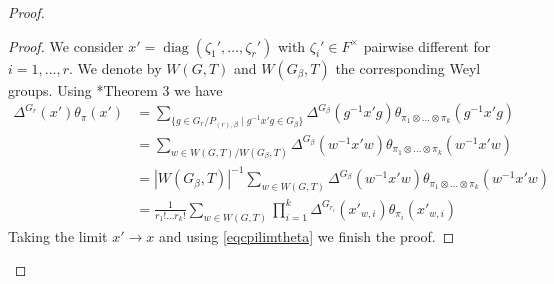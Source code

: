 \documentclass{amsart}
\numberwithin{equation}{section}
\newtheorem{corollary}[theorem]{\bf{Corollary}}
\newcommand{\car}[1]{\left|#1\right|}
\newcommand{\mrdiag}{\operatorname{diag}}
\begin{document}
\begin{proof}
\begin{proof}
			We consider $x'=\mrdiag(\zeta_{1}',\dots,\zeta_{r}')$ with $\zeta_{i}'\in F^{\times}$ pairwise different for $i=1,\dots,r$. We denote by $W(G,T)$ and $W(G_{\beta},T)$ the corresponding Weyl groups.
			Using \cite{van1972computation}*{Theorem 3} we have
			\begin{align*}
				\Delta^{G_{r}}(x')\theta_{\pi}(x')&=\sum_{\{g\in G_{r}/P_{(r),\beta}\mid g^{-1}x'g\in G_{\beta}\}}\Delta^{G_{\beta}}(g^{-1}x'g)\theta_{\pi_{1}\otimes\dots\otimes\pi_{k}}(g^{-1}x'g)\\
				&=\sum_{w\in W(G, T)/W(G_{\beta},T)}\Delta^{G_{\beta}}(w^{-1}x'w)\theta_{\pi_{1}\otimes\dots\otimes\pi_{k}}(w^{-1}x'w)\\
				&=\car{W(G_{\beta},T)}^{-1}\sum_{w\in W(G,T)}\Delta^{G_{\beta}}(w^{-1}x'w)\theta_{\pi_{1}\otimes\dots\otimes\pi_{k}}(w^{-1}x'w)\\
				&=\frac{1}{r_{1}!\dots r_{k}!}\sum_{w\in W(G,T)}\prod_{i=1}^{k}\Delta^{G_{r_{i}}}(x'_{w,i})\theta_{\pi_{i}}(x'_{w,i})
			\end{align*}
			Taking the limit $x'\rightarrow x$ and using \eqref{eqcpilimtheta} we finish the proof.
			
		\end{proof}
		

			

\end{proof}
\end{document}
